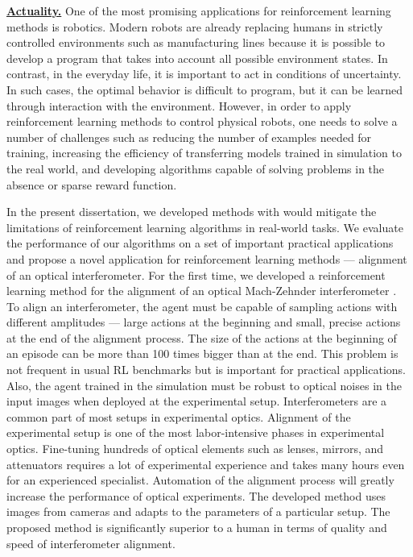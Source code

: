 \underline{\textbf{Actuality.}}  One of the most promising applications for reinforcement learning methods is robotics. Modern robots are already replacing humans in strictly controlled environments such as manufacturing lines because it is possible to develop a program that takes into account all possible environment states. In contrast, in the everyday life, it is important to act in conditions of uncertainty. In such cases, the optimal behavior is difficult to program, but it can be learned through interaction with the environment. However, in order to apply reinforcement learning methods to control physical robots, one needs to solve a number of challenges such as reducing the number of examples needed for training, increasing the efficiency of transferring models trained in simulation to the real world, and developing algorithms capable of solving problems in the absence or sparse reward function. 

In the present dissertation, we developed methods with would mitigate the limitations of reinforcement learning algorithms in real-world tasks. We evaluate the performance of our algorithms on a set of important practical applications and propose a novel application for reinforcement learning methods --- alignment of an optical interferometer. 
For the first time, we developed a reinforcement learning method for the alignment of an optical Mach-Zehnder interferometer \cite{interferobot, v2}. To align an interferometer, the agent must be capable of sampling actions with different amplitudes --- large actions at the beginning and small, precise actions at the end of the alignment process. The size of the actions at the beginning of an episode can be more than 100 times bigger than at the end. This problem is not frequent in usual RL benchmarks but is important for practical applications. Also, the agent trained in the simulation must be robust to optical noises in the input images when deployed at the experimental setup. Interferometers are a common part of most setups in experimental optics. Alignment of the experimental setup is one of the most labor-intensive phases in experimental optics. Fine-tuning hundreds of optical elements such as lenses, mirrors, and attenuators requires a lot of experimental experience and takes many hours even for an experienced specialist. Automation of the alignment process will greatly increase the performance of optical experiments. The developed method uses images from cameras and adapts to the parameters of a particular setup. The proposed method is significantly superior to a human in terms of quality and speed of interferometer alignment.

